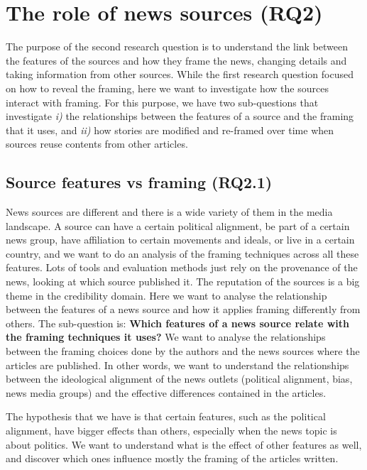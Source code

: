 \section{The role of news sources (RQ2)}
\label{sec:prop_rq2}

The purpose of the second research question is to understand the link between the features of the sources and how they frame the news, changing details and taking information from other sources.
While the first research question focused on how to reveal the framing, here we want to investigate how the sources interact with framing. For this purpose, we have two sub-questions that investigate \emph{i)} the relationships between the features of a source and the framing that it uses, and \emph{ii)} how stories are modified and re-framed over time when sources reuse contents from other articles.

\subsection{Source features vs framing (RQ2.1)}
News sources are different and there is a wide variety of them in the media landscape.
A source can have a certain political alignment, be part of a certain news group, have affiliation to certain movements and ideals, or live in a certain country, and we want to do an analysis of the framing techniques across all these features.
Lots of tools and evaluation methods just rely on the provenance of the news, looking at which source published it. The reputation of the sources is a big theme in the credibility domain.
Here we want to analyse the relationship between the features of a news source and how it applies framing differently from others. The sub-question is:
\textbf{Which features of a news source relate with the framing techniques it uses?}
We want to analyse the relationships between the framing choices done by the authors and the news sources where the articles are published. In other words, we want to understand the relationships between the ideological alignment of the news outlets (political alignment, bias, news media groups) and the effective differences contained in the articles.



The hypothesis that we have is that certain features, such as the political alignment, have bigger effects than others, especially when the news topic is about politics.
We want to understand what is the effect of other features as well, and discover which ones influence mostly the framing of the articles written.

